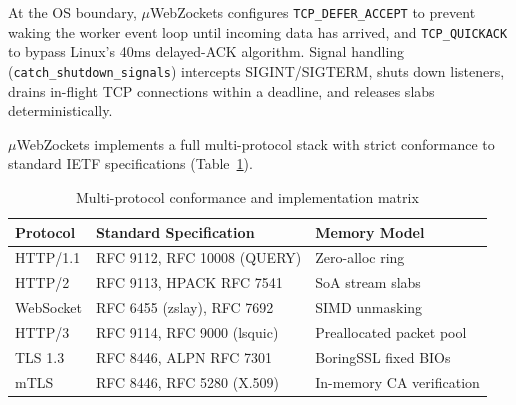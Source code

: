 \documentclass[journal]{IEEEtran}
\begin{document}
At the OS boundary, \ensuremath{\mu}WebZockets configures \texttt{TCP\_DEFER\_ACCEPT} to prevent waking the worker event loop until incoming data has arrived, and \texttt{TCP\_QUICKACK} to bypass Linux's 40ms delayed-ACK algorithm. Signal handling (\texttt{catch\_shutdown\_signals}) intercepts SIGINT/SIGTERM, shuts down listeners, drains in-flight TCP connections within a deadline, and releases slabs deterministically.

\ensuremath{\mu}WebZockets implements a full multi-protocol stack with strict conformance to standard IETF specifications (Table~\ref{tab:protocol-matrix}).

\begin{table}[!ht]
\caption{Multi-protocol conformance and implementation matrix}
\label{tab:protocol-matrix}
\centering
\small
\begin{tabularx}{\columnwidth}{@{}lXl@{}}
\toprule
\textbf{Protocol} & \textbf{Standard Specification} & \textbf{Memory Model} \\
\midrule
HTTP/1.1 & RFC 9112, RFC 10008 (QUERY) & Zero-alloc ring \\
HTTP/2 & RFC 9113, HPACK RFC 7541 & SoA stream slabs \\
WebSocket & RFC 6455 (zslay), RFC 7692 & SIMD unmasking \\
HTTP/3 & RFC 9114, RFC 9000 (lsquic) & Preallocated packet pool \\
TLS 1.3 & RFC 8446, ALPN RFC 7301 & BoringSSL fixed BIOs \\
mTLS & RFC 8446, RFC 5280 (X.509) & In-memory CA verification \\
\bottomrule
\end{tabularx}
\end{table}
\end{document}
